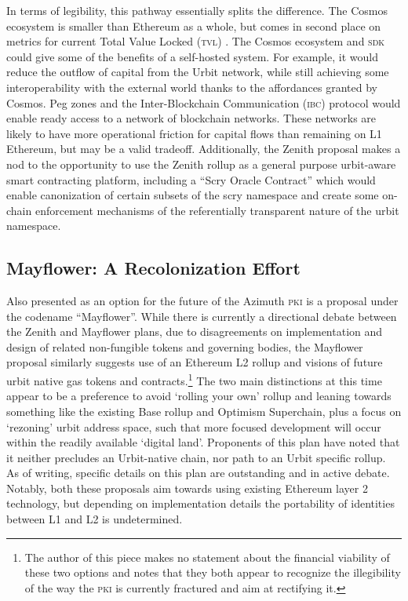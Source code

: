 \documentclass[twoside]{article}
\begin{document}
In terms of legibility, this pathway essentially splits the difference. The Cosmos ecosystem is smaller than Ethereum as a whole, but comes in second place on metrics for current Total Value Locked (\textsc{tvl}) \citep{CosmosTVL}.  The Cosmos ecosystem and \textsc{sdk} could give some of the benefits of a self-hosted system. For example, it would reduce the outflow of capital from the Urbit network, while still achieving some interoperability with the external world thanks to the affordances granted by Cosmos. Peg zones and the Inter-Blockchain Communication (\textsc{ibc}) protocol would enable ready access to a network of blockchain networks. These networks are likely to have more operational friction for capital flows than remaining on L1 Ethereum, but may be a valid tradeoff. Additionally, the Zenith proposal makes a nod to the opportunity to use the Zenith rollup as a general purpose urbit-aware smart contracting platform, including a ``Scry Oracle Contract'' which would enable canonization of certain subsets of the scry namespace and create some on-chain enforcement mechanisms of the referentially transparent nature of the urbit namespace.

\subsection{Mayflower: A Recolonization Effort}

Also presented as an option for the future of the Azimuth \textsc{pki} is a proposal under the codename ``Mayflower''. While there is currently a directional debate between the Zenith and Mayflower plans, due to disagreements on implementation and design of related non-fungible tokens and governing bodies, the Mayflower proposal similarly suggests use of an Ethereum L2 rollup and visions of future urbit native gas tokens and contracts.\footnote{The author of this piece makes no statement about the financial viability of these two options and notes that they both appear to recognize the illegibility of the way the \textsc{pki} is currently fractured and aim at rectifying it.} The two main distinctions at this time appear to be a preference to avoid `rolling your own' rollup and leaning towards something like the existing Base rollup and Optimism Superchain, plus a focus on `rezoning' urbit address space, such that more focused development will occur within the readily available `digital land'. Proponents of this plan have noted that it neither precludes an Urbit-native chain, nor path to an Urbit specific rollup. As of writing, specific details on this plan are outstanding and in active debate. Notably, both these proposals aim towards using existing Ethereum layer 2 technology, but depending on implementation details the portability of identities between L1 and L2 is undetermined.
\end{document}
